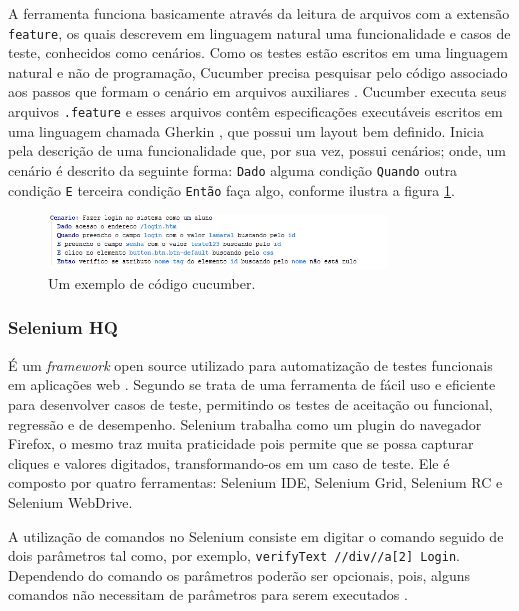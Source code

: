 \documentclass[tg]{mdtufsm}
\begin{document}
A ferramenta funciona basicamente através da leitura de arquivos com a extensão \texttt{feature}, os quais descrevem em linguagem natural uma funcionalidade e casos de teste, conhecidos como cenários.
Como os testes estão escritos em uma linguagem natural e não de programação, Cucumber precisa pesquisar pelo código associado aos passos que formam o cenário em arquivos auxiliares \cite{scmitzcucumberreview}. Cucumber
executa seus arquivos \texttt{.feature} e esses arquivos contêm especificações executáveis escritos em uma linguagem chamada Gherkin \cite{cucumberwiki}, que possui um layout bem definido. Inicia pela descrição de uma funcionalidade
que, por sua vez, possui cenários; onde, um cenário é descrito da seguinte forma: \texttt{Dado} alguma condição \texttt{Quando} outra condição \texttt{E} terceira condição \texttt{Então} faça algo, conforme ilustra a figura \ref{fig:codigo_cucumber}.

\begin{figure}[!htb]
    \centering
    \includegraphics[width=0.8\textwidth]{codigo_cucumber}
    \caption{Um exemplo de código cucumber.}
    \label{fig:codigo_cucumber}
\end{figure}

\subsubsection{Selenium HQ}
É um \emph{framework} open source utilizado para automatização de testes funcionais em aplicações web \cite{chiavegatto1desenvolvimento}. Segundo \citeauthor{pereiraestudoselenium} \cite{pereiraestudoselenium} se trata
de uma ferramenta de fácil uso e eficiente para desenvolver casos de teste, permitindo os testes de aceitação ou funcional, regressão e de desempenho.
Selenium trabalha como um plugin do navegador Firefox, o mesmo traz muita praticidade pois permite que se possa capturar cliques e valores digitados, transformando-os em um caso de teste. Ele é composto por
quatro ferramentas: Selenium IDE, Selenium Grid, Selenium RC e Selenium WebDrive.

A utilização de comandos no Selenium consiste em digitar o comando seguido de dois parâmetros tal como, por exemplo, \texttt{verifyText //div//a[2] Login}. Dependendo  do comando os parâmetros poderão ser opcionais, pois, alguns comandos não necessitam de parâmetros para serem executados \cite{sixpenceautomatizaccao}.
\end{document}
